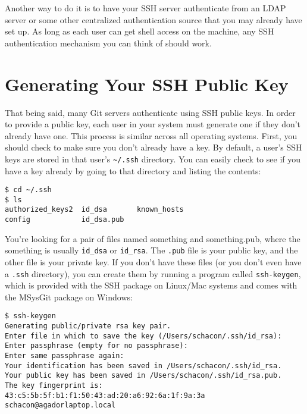 \documentclass[a4paper]{book}
\begin{document}
Another way to do it is to have your SSH server authenticate from an LDAP server or some other centralized authentication source that you may already have set up. As long as each user can get shell access on the machine, any SSH authentication mechanism you can think of should work.

\section{Generating Your SSH Public Key}\label{generating-your-ssh-public-key}

That being said, many Git servers authenticate using SSH public keys. In order to provide a public key, each user in your system must generate one if they don't already have one. This process is similar across all operating systems. First, you should check to make sure you don't already have a key. By default, a user's SSH keys are stored in that user's \texttt{\textasciitilde{}/.ssh} directory. You can easily check to see if you have a key already by going to that directory and listing the contents:

\begin{shaded}\begin{verbatim}
$ cd ~/.ssh
$ ls
authorized_keys2  id_dsa       known_hosts
config            id_dsa.pub
\end{verbatim}\end{shaded}

You're looking for a pair of files named something and something.pub, where the something is usually \texttt{id\_dsa} or \texttt{id\_rsa}. The \texttt{.pub} file is your public key, and the other file is your private key. If you don't have these files (or you don't even have a \texttt{.ssh} directory), you can create them by running a program called \texttt{ssh-keygen}, which is provided with the SSH package on Linux/Mac systems and comes with the MSysGit package on Windows:

\begin{shaded}\begin{verbatim}
$ ssh-keygen
Generating public/private rsa key pair.
Enter file in which to save the key (/Users/schacon/.ssh/id_rsa):
Enter passphrase (empty for no passphrase):
Enter same passphrase again:
Your identification has been saved in /Users/schacon/.ssh/id_rsa.
Your public key has been saved in /Users/schacon/.ssh/id_rsa.pub.
The key fingerprint is:
43:c5:5b:5f:b1:f1:50:43:ad:20:a6:92:6a:1f:9a:3a schacon@agadorlaptop.local
\end{verbatim}\end{shaded}
\end{document}

